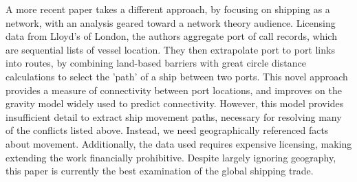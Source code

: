 
A more recent paper \citep{Kaluza2010} takes a different approach, by focusing on shipping as a network, with an analysis geared toward a network theory audience. Licensing data from Lloyd's of London, %
 the authors aggregate port of call records, which are sequential lists of vessel location. They then extrapolate port to port links into routes, by combining land-based barriers with great circle distance calculations to select the 'path' of a ship between two ports. This novel approach provides a measure of connectivity between port locations, and improves on the gravity model widely used to predict connectivity. %
However, this model provides insufficient detail to extract ship movement paths, necessary for resolving many of the conflicts listed above. Instead, we need geographically referenced facts about movement. Additionally, the data used requires expensive licensing, making extending the work financially prohibitive. Despite largely ignoring geography, this paper is currently the best examination of the global shipping trade.


